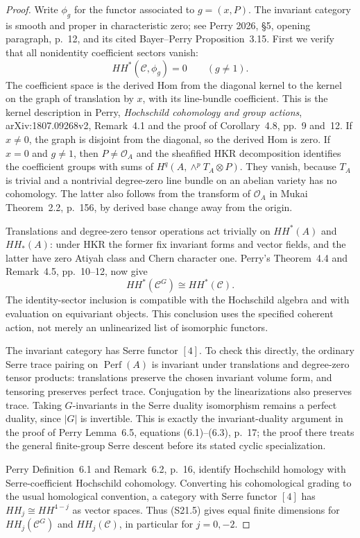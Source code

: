\documentclass[11pt,a4paper]{article}
\theoremstyle{definition}
\begin{document}
\begin{proof}
Write $\phi_g$ for the functor associated to $g=(x,P)$.
The invariant category is smooth and proper in characteristic
zero; see Perry 2026, \S5, opening paragraph, p.~12,
and its cited Bayer--Perry Proposition~3.15.
First we verify that all nonidentity coefficient sectors vanish:
\[
 HH^*(\mathcal C,\phi_g)=0\qquad(g\ne1).
 \tag{S21.4}
\]
The coefficient space is the derived Hom from the diagonal
kernel to the kernel on the graph of translation by $x$,
with its line-bundle coefficient. This is the kernel
description in Perry, \emph{Hochschild cohomology and group
actions}, arXiv:1807.09268v2, Remark~4.1 and the proof of
Corollary~4.8, pp.~9 and~12. If $x\ne0$, the graph is
disjoint from the diagonal, so the derived Hom is zero.
If $x=0$ and $g\ne1$, then $P\ne\mathcal O_A$ and
the sheafified HKR decomposition identifies the coefficient
groups with sums of
$H^q(A,\wedge^pT_A\otimes P)$.
They vanish, because $T_A$ is trivial and a nontrivial
degree-zero line bundle on an abelian variety has no
cohomology. The latter also follows from the transform of
$\mathcal O_A$ in Mukai Theorem~2.2, p.~156, by derived
base change away from the origin.

Translations and degree-zero tensor operations act trivially
on $HH^*(A)$ and $HH_*(A)$: under HKR the former fix invariant
forms and vector fields, and the latter have zero Atiyah
class and Chern character one. Perry's Theorem~4.4 and
Remark~4.5, pp.~10--12, now give
\[
 HH^*(\mathcal C^G)\cong HH^*(\mathcal C).
 \tag{S21.5}
\]
The identity-sector inclusion is compatible with the
Hochschild algebra and with evaluation on equivariant objects.
This conclusion uses the specified coherent action, not
merely an unlinearized list of isomorphic functors.

The invariant category has Serre functor $[4]$.
To check this directly, the ordinary Serre trace pairing on
$\operatorname{Perf}(A)$ is invariant under translations
and degree-zero tensor products: translations preserve the
chosen invariant volume form, and tensoring preserves
perfect trace. Conjugation by the linearizations also
preserves trace. Taking $G$-invariants in the Serre duality
isomorphism remains a perfect duality, since $|G|$ is
invertible. This is exactly the invariant-duality argument
in the proof of Perry Lemma~6.5, equations (6.1)--(6.3),
p.~17; the proof there treats the general finite-group
Serre descent before its stated cyclic specialization.

Perry Definition~6.1 and Remark~6.2, p.~16, identify
Hochschild homology with Serre-coefficient Hochschild
cohomology. Converting his cohomological grading to the
usual homological convention, a category with Serre functor
$[4]$ has $HH_j\cong HH^{4-j}$ as vector spaces.
Thus (S21.5) gives equal finite dimensions for
$HH_j(\mathcal C^G)$ and $HH_j(\mathcal C)$, in particular
for $j=0,-2$.


\end{proof}
\end{document}
